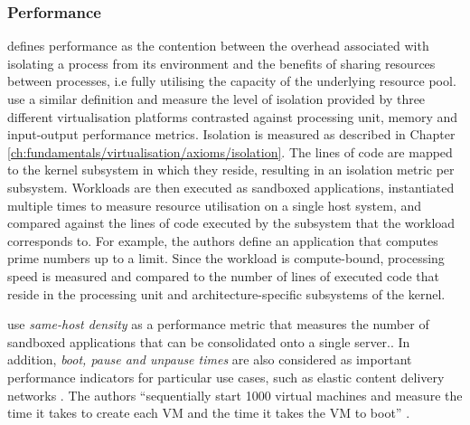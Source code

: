 \subsubsection{Performance}
\label{ch:fundamentals/virtualisation/axioms/performance}
\textcite{10.1145/3365199} defines performance as the contention between the overhead associated 
with isolating a process from its environment and the benefits of sharing resources between processes,
i.e fully utilising the capacity of the underlying resource pool. \textcite{10.1145/3381052.3381315}
use a similar definition and measure the level of isolation provided by three different virtualisation 
platforms contrasted against processing unit, memory and input-output performance metrics. 
Isolation is measured as described in Chapter \ref{ch:fundamentals/virtualisation/axioms/isolation}.
The lines of code are mapped to the kernel 
subsystem in which they reside, resulting in an isolation metric per subsystem.
Workloads are then executed as sandboxed applications, instantiated multiple times to measure resource 
utilisation on a single host system, and compared against the lines of code executed by the subsystem 
that the workload corresponds to. For example, the authors define an application that computes prime numbers up 
to a limit. Since the workload is compute-bound, processing speed is measured and compared to the 
number of lines of executed code that reside in the processing unit and architecture-specific subsystems of
the kernel.

\textcite{10.1145/3132747.3132763} use \textit{same-host density} as a performance metric that measures 
the number of sandboxed applications that can be consolidated onto a single server.. 
In addition, \textit{boot, pause and unpause times} are also considered as important performance indicators for particular 
use cases, such as elastic content delivery networks \cite{10.1145/3050748.3050757} \cite{10.1145/3132747.3132763}.
The authors \enquote{sequentially start 1000 virtual machines and measure the time it takes to
create each VM and the time it takes the VM to boot} \cite[5]{10.1145/3132747.3132763}.

